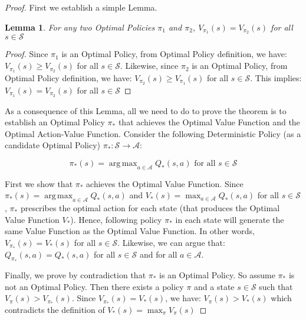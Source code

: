 \documentclass[12pt]{amsart}
\newtheorem{lemma}{Lemma}
\DeclareMathOperator*{\argmax}{arg\,max}
\begin{document}
\begin{proof}
First we establish a simple Lemma.
\begin{lemma}
For any two Optimal Policies $\pi_1$ and $\pi_2$, $V_{\pi_1}(s) = V_{\pi_2}(s)$ for all $s \in \mathcal{S}$
\end{lemma}
\begin{proof}
Since $\pi_1$ is an Optimal Policy, from Optimal Policy definition, we have: $V_{\pi_1}(s) \geq V_{\pi_2}(s)$ for all $s \in \mathcal{S}$.
Likewise, since $\pi_2$ is an Optimal Policy, from Optimal Policy definition, we have: $V_{\pi_2}(s) \geq V_{\pi_1}(s)$ for all $s \in \mathcal{S}$.
This implies: $V_{\pi_1}(s) = V_{\pi_2}(s)$ for all $s \in \mathcal{S}$
\end{proof}

As a consequence of this Lemma, all we need to do to prove the theorem is to establish an Optimal Policy $\pi_*$ that achieves the Optimal Value Function and the Optimal Action-Value Function. Consider the following Deterministic Policy (as a candidate Optimal Policy) $\pi_* : \mathcal{S} \rightarrow \mathcal{A}$:

$$\pi_*(s) = \argmax_{a \in \mathcal{A}} Q_*(s,a) \mbox{ for all } s \in \mathcal{S}$$

First we show that $\pi_*$ achieves the Optimal Value Function.  Since $\pi_*(s) = \argmax_{a \in \mathcal{A}} Q_*(s,a)$ and $V_*(s) = \max_{a \in \mathcal{A}} Q_*(s,a)$ for all $s \in \mathcal{S}$, $\pi_*$ prescribes the optimal action for each state (that produces the Optimal Value Function $V_*$). Hence, following policy $\pi_*$ in each state will generate the same Value Function as the Optimal Value Function. In other words, $V_{\pi_*}(s) = V_*(s)$ for all $s \in \mathcal{S}$. Likewise, we can argue that: $Q_{\pi_*}(s,a) = Q_*(s,a)$ for all $s \in \mathcal{S}$ and for all $a \in \mathcal{A}$.

Finally, we prove by contradiction that $\pi_*$ is an Optimal Policy. So assume $\pi_*$ is not an Optimal Policy. Then there exists a policy $\pi$ and a state $s \in \mathcal{S}$ such that $V_{\pi}(s) > V_{\pi_*}(s)$. Since $V_{\pi_*}(s) = V_*(s)$, we have: $V_{\pi}(s) > V_*(s)$ which contradicts the definition of $V_*(s) = \max_{\pi} V_{\pi}(s)$

\end{proof}
\end{document}

